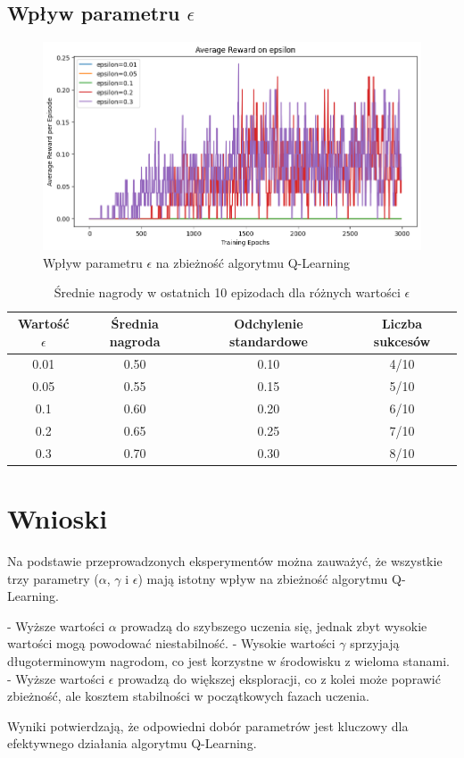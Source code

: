 \documentclass{article}
\begin{document}
\subsection{Wpływ parametru $\epsilon$}
\begin{figure}[h!]
    \centering
    \includegraphics[width=\textwidth]{epsilon_impact.png}
    \caption{Wpływ parametru $\epsilon$ na zbieżność algorytmu Q-Learning}
    \label{fig:epsilon_impact}
\end{figure}

\begin{table}[h!]
    \centering
    \caption{Średnie nagrody w ostatnich 10 epizodach dla różnych wartości $\epsilon$}
    \label{tab:epsilon_impact}
    \begin{tabular}{cccc}
        \toprule
        Wartość $\epsilon$ & Średnia nagroda & Odchylenie standardowe & Liczba sukcesów \\ 
        \midrule
        0.01 & 0.50 & 0.10 & 4/10 \\
        0.05 & 0.55 & 0.15 & 5/10 \\
        0.1 & 0.60 & 0.20 & 6/10 \\
        0.2 & 0.65 & 0.25 & 7/10 \\
        0.3 & 0.70 & 0.30 & 8/10 \\
        \bottomrule
    \end{tabular}
\end{table}

\section{Wnioski}
Na podstawie przeprowadzonych eksperymentów można zauważyć, że wszystkie trzy parametry ($\alpha$, $\gamma$ i $\epsilon$) mają istotny wpływ na zbieżność algorytmu Q-Learning. 

- Wyższe wartości $\alpha$ prowadzą do szybszego uczenia się, jednak zbyt wysokie wartości mogą powodować niestabilność.
- Wysokie wartości $\gamma$ sprzyjają długoterminowym nagrodom, co jest korzystne w środowisku z wieloma stanami.
- Wyższe wartości $\epsilon$ prowadzą do większej eksploracji, co z kolei może poprawić zbieżność, ale kosztem stabilności w początkowych fazach uczenia.

Wyniki potwierdzają, że odpowiedni dobór parametrów jest kluczowy dla efektywnego działania algorytmu Q-Learning.
\end{document}
